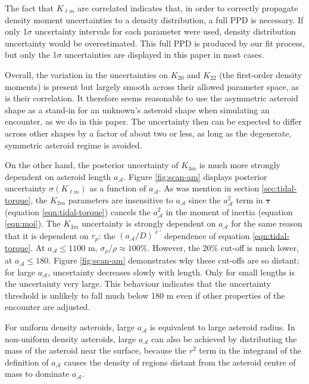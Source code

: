 \documentclass[fleqn,usenatbib]{mnras}
\begin{document}
The fact that $K_{\ell m}$ are correlated indicates that, in order to correctly propagate density moment uncertainties to a density distribution, a full PPD is necessary. If only 1$\sigma$ uncertainty intervals for each parameter were used, density distribution uncertainty would be overestimated. This full PPD is produced by our fit process, but only the 1$\sigma$ uncertainties are displayed in this paper in most cases.

Overall, the variation in the uncertainties on $K_{20}$ and $K_{22}$ (the first-order density moments) is present but largely smooth across their allowed parameter space, as is their correlation. It therefore seems reasonable to use the asymmetric asteroid shape as a stand-in for an unknown's asteroid shape when simulating an encounter, as we do in this paper. The uncertainty then can be expected to differ across other shapes by a factor of about two or less, as long as the degenerate, symmetric asteroid regime is avoided.

On the other hand, the posterior uncertainty of $K_{3m}$ is much more strongly dependent on asteroid length $a_\mathcal{A}$. Figure \ref{fig:scan-am} displays posterior uncertainty $\sigma(K_{\ell m})$ as a function of $a_\mathcal{A}$. As was mention in section \ref{sec:tidal-torque}, the $K_{2m}$ parameters are insensitive to $a_\mathcal{A}$ since the $a_\mathcal{A}^2$ term in $\bm \tau$ (equation \ref{eqn:tidal-torque}) cancels the $a_\mathcal{A}^2$ in the moment of inertia (equation \ref{eqn:moi}). The $K_{3m}$ uncertainty is strongly dependent on $a_\mathcal{A}$ for the same reason that it is dependent on $r_p$: the $(a_\mathcal{A}/D)^{\ell'}$ dependence of equation \ref{eqn:tidal-torque}. At $a_\mathcal{A} \leq 1100$ m, $\sigma_\rho/\rho \approx 100\%$. However, the 20\% cut-off is much lower, at $a_\mathcal{A} \leq 180$. Figure \ref{fig:scan-am} demonstrates why these cut-offs are so distant; for large $a_\mathcal{A}$, uncertainty decreases slowly with length. Only for small lengths is the uncertainty very large. This behaviour indicates that the uncertainty threshold is unlikely to fall much below 180 m even if other properties of the encounter are adjusted.

For uniform density asteroids, large $a_\mathcal{A}$ is equivalent to large asteroid radius. In non-uniform density asteroids, large $a_\mathcal{A}$ can also be achieved by distributing the mass of the asteroid near the surface, because the $r^2$ term in the integrand of the definition of $a_\mathcal{A}$ causes the density of regions distant from the asteroid centre of mass to dominate $a_\mathcal{A}$.
\end{document}
